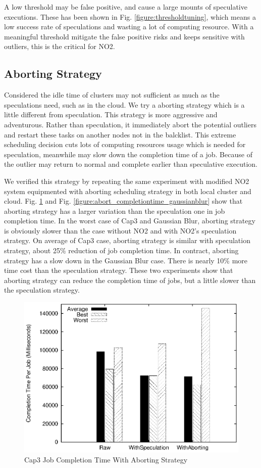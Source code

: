 A low threshold may be false positive, and cause a large mounts of speculative executions. These has been shown in Fig.  \ref{figure:thresholdtuning}, which means a low success rate of speculations and wasting a lot of computing resource. With a meaningful threshold mitigate the false positive risks and keeps sensitive with outliers, this is the critical for NO2.

\subsection{Aborting Strategy}

Considered the idle time of clusters may not sufficient as much as the speculations need, such as in the cloud. We try a aborting strategy which is a little different from speculation. This strategy is more aggressive and adventurous. Rather than speculation, it immediately abort the potential outliers and restart these tasks on another nodes not in the balcklist. This extreme scheduling decision cuts lots of computing resources usage which is needed for speculation, meanwhile may slow down the completion time of a job. Because of the outlier may return to normal and complete earlier than speculative execution.

We verified this strategy by repeating the same experiment with modified NO2 system equipmented with aborting scheduling strategy in both local cluster and cloud. Fig. \ref{figure:abort_completiontime_cap3} and Fig. \ref{figure:abort_completiontime_gaussianblur} show that aborting strategy has a larger variation than the speculation one in job completion time. In the worst case of Cap3 and Gaussian Blur, aborting strategy is obviously slower than the case without NO2 and with NO2's speculation strategy. On average of Cap3 case, aborting strategy is similar with speculation strategy, about 25\% reduction of job completion time. In contract, aborting strategy has a slow down in the Gaussian Blur case. There is nearly 10\% more time cost than the speculation strategy. These two experiments show that aborting strategy can reduce the completion time of jobs, but a little slower than the speculation strategy.

\begin{figure}
\centering
\includegraphics[width=0.9\columnwidth]{figures/abort_completiontime_cap3.eps}
\caption{Cap3 Job Completion Time With Aborting Strategy}
\label{figure:abort_completiontime_cap3}
\end{figure}

